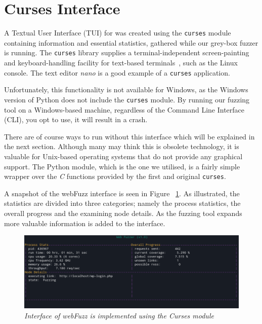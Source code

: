 \section{Curses Interface}
A Textual User Interface (TUI) for \pname{} was created using the {\tt curses} module containing information and essential statistics, gathered while our grey-box fuzzer is running. The {\tt curses} library supplies a terminal-independent screen-painting and keyboard-handling facility for text-based terminals~\cite{curses}, such as the Linux console. The text editor \textit{nano} is a good example of a {\tt curses} application. 

Unfortunately, this functionality is not available for Windows, as the Windows version of Python does not include the {\tt curses} module. By running our fuzzing tool on a Windows-based machine, regardless of the Command Line Interface (CLI), you opt to use, it will result in a crash. 

There are of course ways to run \pname{} without this interface which will be explained in the next  section. Although many may think this is obsolete technology, it is valuable for Unix-based operating systems that do not provide any graphical support. The Python module, which is the one we utilised, is a fairly simple wrapper over the \textit{C} functions provided by the first and original {\tt curses}. 

A snapshot of the webFuzz interface is seen in Figure ~\ref{fig:curses_interface}. As illustrated, the statistics are divided into three categories; namely the process statistics, the overall progress and the examining node details. As the fuzzing tool expands more valuable information is added to the interface.

\begin{figure}[ht]
 \centering
 \captionsetup{justification=centering}
 \includegraphics[width=\linewidth]{figures/curses.png}
 \caption[Interface of webFuzz]
 {\textit{Interface of webFuzz is implemented using the Curses module}}
 \label{fig:curses_interface}
\end{figure}

